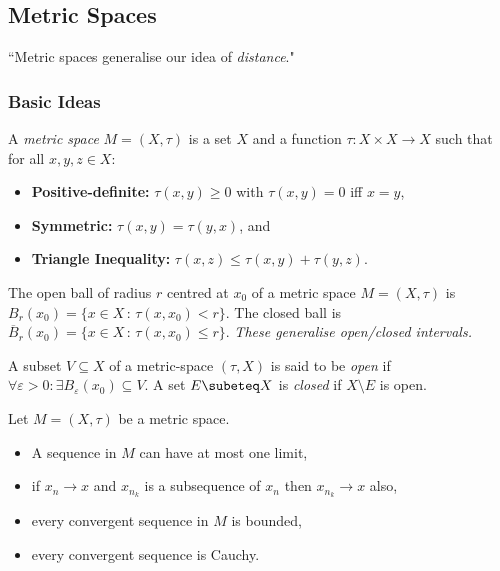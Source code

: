 \begin{multicols}{2}
\section*{Metric Spaces\vspace{-2ex}}
\scriptsize{``Metric spaces generalise our idea of \textit{distance}."}\small
\subsubsection*{\vspace{-2ex}Basic Ideas\vspace{-1ex}}

\begin{axiom}
A \textit{metric space} $M=(X,\tau)$ is a set $X$ and a function $\tau:X\times X\to X$ such that for all $x,y,z\in X:$
    \begin{itemize}
        \item{\textbf{Positive-definite: }$\tau(x,y)\geq0$ with $\tau(x,y)=0$ iff $x=y$,}
        \item{\textbf{Symmetric: }$\tau(x,y)=\tau(y,x)$, and}
        \item{\textbf{Triangle Inequality: }$\tau(x,z)\leq\tau(x,y)+\tau(y,z)$.}
    \end{itemize}
\end{axiom}

\begin{definition}
The open ball of radius $r$ centred at $x_0$ of a metric space $M=(X,\tau)$ is $B_r(x_0) = \{x\in X\,:\,\tau(x,x_0)<r\}$. The closed ball is $\overline{B}_r(x_0)= \{x\in X\,:\,\tau(x,x_0)\leq r\}$. \textit{These generalise open/closed intervals.}
\end{definition}

\begin{definition}
A subset $V\subseteq X$ of a metric-space $(\tau,X)$ is said to be \textit{open} if $\forall\varepsilon>0:\exists B_\varepsilon(x_0)\subseteq V$. A set $E\subeteq X$ is \textit{closed} if $X\setminus E$ is open.
\end{definition}

\begin{theorem}[10.14]
Let $M=(X,\tau)$ be a metric space.
    \begin{itemize}
        \item{A sequence in $M$ can have at most one limit,}
        \item{if $x_n\to x$ and $x_{n_k}$ is a subsequence of $x_n$ then $x_{n_k}\to x$ also,}
        \item{every convergent sequence in $M$ is bounded,}
        \item{every convergent sequence is Cauchy.}
    \end{itemize}
\end{theorem}


\end{multicols}
